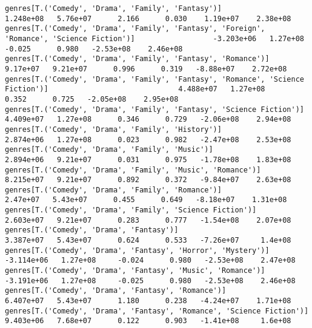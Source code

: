 \documentclass[11pt]{article}
\begin{document}
\begin{Verbatim}[commandchars=\\\{\}]
genres[T.('Comedy', 'Drama', 'Family', 'Fantasy')]                                                            1.248e+08   5.76e+07      2.166      0.030    1.19e+07    2.38e+08
genres[T.('Comedy', 'Drama', 'Family', 'Fantasy', 'Foreign', 'Romance', 'Science Fiction')]                  -3.203e+06   1.27e+08     -0.025      0.980   -2.53e+08    2.46e+08
genres[T.('Comedy', 'Drama', 'Family', 'Fantasy', 'Romance')]                                                  9.17e+07   9.21e+07      0.996      0.319   -8.88e+07    2.72e+08
genres[T.('Comedy', 'Drama', 'Family', 'Fantasy', 'Romance', 'Science Fiction')]                              4.488e+07   1.27e+08      0.352      0.725   -2.05e+08    2.95e+08
genres[T.('Comedy', 'Drama', 'Family', 'Fantasy', 'Science Fiction')]                                         4.409e+07   1.27e+08      0.346      0.729   -2.06e+08    2.94e+08
genres[T.('Comedy', 'Drama', 'Family', 'History')]                                                            2.874e+06   1.27e+08      0.023      0.982   -2.47e+08    2.53e+08
genres[T.('Comedy', 'Drama', 'Family', 'Music')]                                                              2.894e+06   9.21e+07      0.031      0.975   -1.78e+08    1.83e+08
genres[T.('Comedy', 'Drama', 'Family', 'Music', 'Romance')]                                                   8.215e+07   9.21e+07      0.892      0.372   -9.84e+07    2.63e+08
genres[T.('Comedy', 'Drama', 'Family', 'Romance')]                                                             2.47e+07   5.43e+07      0.455      0.649   -8.18e+07    1.31e+08
genres[T.('Comedy', 'Drama', 'Family', 'Science Fiction')]                                                    2.603e+07   9.21e+07      0.283      0.777   -1.54e+08    2.07e+08
genres[T.('Comedy', 'Drama', 'Fantasy')]                                                                      3.387e+07   5.43e+07      0.624      0.533   -7.26e+07     1.4e+08
genres[T.('Comedy', 'Drama', 'Fantasy', 'Horror', 'Mystery')]                                                -3.114e+06   1.27e+08     -0.024      0.980   -2.53e+08    2.47e+08
genres[T.('Comedy', 'Drama', 'Fantasy', 'Music', 'Romance')]                                                 -3.191e+06   1.27e+08     -0.025      0.980   -2.53e+08    2.46e+08
genres[T.('Comedy', 'Drama', 'Fantasy', 'Romance')]                                                           6.407e+07   5.43e+07      1.180      0.238   -4.24e+07    1.71e+08
genres[T.('Comedy', 'Drama', 'Fantasy', 'Romance', 'Science Fiction')]                                        9.403e+06   7.68e+07      0.122      0.903   -1.41e+08     1.6e+08

\end{Verbatim}
\end{document}
